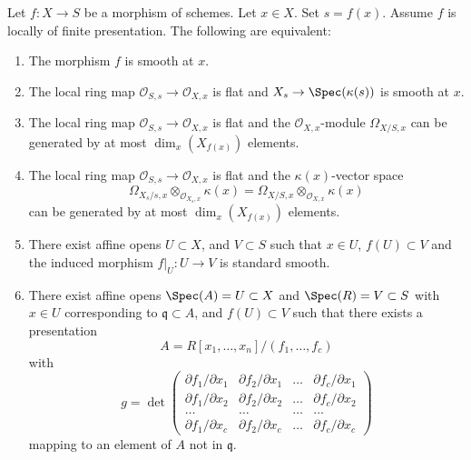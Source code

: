 \begin{lemma}
\label{lemma-smooth-at-point}
Let $f : X \to S$ be a morphism of schemes.
Let $x \in X$.
Set $s = f(x)$.
Assume $f$ is locally of finite presentation.
The following are equivalent:
\begin{enumerate}
\item The morphism $f$ is smooth at $x$.
\item The local ring map $\mathcal{O}_{S, s} \to \mathcal{O}_{X, x}$
is flat and $X_s \to \Spec(\kappa(s))$ is smooth at $x$.
\item The local ring map $\mathcal{O}_{S, s} \to \mathcal{O}_{X, x}$
is flat and the $\mathcal{O}_{X, x}$-module $\Omega_{X/S, x}$
can be generated by at most $\dim_x(X_{f(x)})$ elements.
\item The local ring map $\mathcal{O}_{S, s} \to \mathcal{O}_{X, x}$
is flat and the $\kappa(x)$-vector space
$$
\Omega_{X_s/s, x} \otimes_{\mathcal{O}_{X_s, x}} \kappa(x) =
\Omega_{X/S, x} \otimes_{\mathcal{O}_{X, x}} \kappa(x)
$$
can be generated by at most $\dim_x(X_{f(x)})$ elements.
\item There exist affine opens $U \subset X$,
and $V \subset S$ such that $x \in U$, $f(U) \subset V$ and the
induced morphism $f|_U : U \to V$ is standard smooth.
\item There exist affine opens $\Spec(A) = U \subset X$
and $\Spec(R) = V \subset S$ with $x \in U$ corresponding
to $\mathfrak q \subset A$, and $f(U) \subset V$
such that there exists a presentation
$$
A = R[x_1, \ldots, x_n]/(f_1, \ldots, f_c)
$$
with
$$
g =
\det
\left(
\begin{matrix}
\partial f_1/\partial x_1 &
\partial f_2/\partial x_1 &
\ldots &
\partial f_c/\partial x_1 \\
\partial f_1/\partial x_2 &
\partial f_2/\partial x_2 &
\ldots &
\partial f_c/\partial x_2 \\
\ldots & \ldots & \ldots & \ldots \\
\partial f_1/\partial x_c &
\partial f_2/\partial x_c &
\ldots &
\partial f_c/\partial x_c
\end{matrix}
\right)
$$
mapping to an element of $A$ not in $\mathfrak q$.
\end{enumerate}
\end{lemma}

